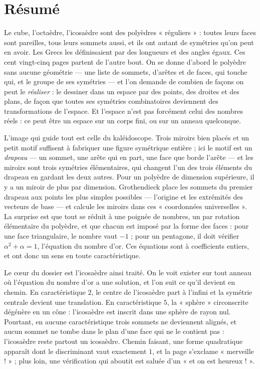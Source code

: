 \documentclass[11pt,a4paper]{article}
\begin{document}
\section*{Résumé}

\begin{resume}
Le cube, l'octaèdre, l'icosaèdre sont des polyèdres « réguliers » : toutes
leurs faces sont pareilles, tous leurs sommets aussi, et ils ont autant de
symétries qu'on peut en avoir. Les Grecs les définissaient par des longueurs et
des angles égaux. Ces cent vingt-cinq pages partent de l'autre bout. On se
donne d'abord le polyèdre sans aucune géométrie --- une liste de sommets,
d'arêtes et de faces, qui touche qui, et le groupe de ses symétries --- et l'on
demande de combien de façons on peut le \emph{réaliser} : le dessiner dans un
espace par des points, des droites et des plans, de façon que toutes ses
symétries combinatoires deviennent des transformations de l'espace. Et l'espace
n'est pas forcément celui des nombres réels : ce peut être un espace sur un
corps fini, ou sur un anneau quelconque.

L'image qui guide tout est celle du kaléidoscope. Trois miroirs bien placés
et un petit motif suffisent à fabriquer une figure symétrique entière ; ici
le motif est un \emph{drapeau} --- un sommet, une arête qui en part, une face
que borde l'arête --- et les miroirs sont trois symétries élémentaires, qui
changent l'un des trois éléments du drapeau en gardant les deux autres. Pour un
polyèdre de dimension supérieure, il y a un miroir de plus par dimension.
Grothendieck place les sommets du premier drapeau aux points les plus simples
possibles --- l'origine et les extrémités des vecteurs de base --- et calcule
les miroirs dans ces « coordonnées universelles ». La surprise est que tout se
réduit à une poignée de nombres, un par rotation élémentaire du polyèdre, et
que chacun est imposé par la forme des faces : pour une face triangulaire, le
nombre vaut $-1$ ; pour un pentagone, il doit vérifier $\alpha^2 + \alpha = 1$,
l'équation du nombre d'or. Ces équations sont à coefficients entiers, et ont
donc un sens en toute caractéristique.

Le cœur du dossier est l'icosaèdre ainsi traité. On le voit exister sur tout
anneau où l'équation du nombre d'or a une solution, et l'on suit ce qu'il
devient en chemin. En caractéristique $2$, le centre de l'icosaèdre part à
l'infini et la symétrie centrale devient une translation. En caractéristique
$5$, la « sphère » circonscrite dégénère en un cône : l'icosaèdre est inscrit
dans une sphère de rayon nul. Pourtant, en aucune caractéristique trois
sommets ne deviennent alignés, et aucun sommet ne tombe dans le plan d'une face
qui ne le contient pas : l'icosaèdre reste partout un icosaèdre. Chemin
faisant, une forme quadratique apparaît dont le discriminant vaut exactement
$1$, et la page s'exclame « merveille ! » ; plus loin, une vérification qui
aboutit est saluée d'un « et on est heureux ! ».


\end{resume}
\end{document}
